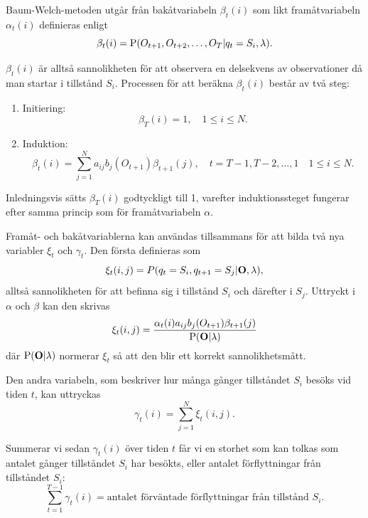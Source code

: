 \documentclass[../rapport_MVEX01-11-05]{subfiles}
\begin{document}
Baum-Welch-metoden utgår från bakåtvariabeln $\beta_t(i)$ som likt
framåtvariabeln $\alpha_t(i)$ definieras enligt
\begin{equation*}
\beta_t(i) = \mathrm{P}(O_{t+1},O_{t+2},\dots,O_T | q_t = S_i, \lambda).
\end{equation*} 

$\beta_t(i)$ är alltså sannolikheten för att observera en delsekvens av
observationer då man startar i tillstånd $S_i$. Processen för att beräkna $\beta_t(i)$ består av två steg:
\begin{enumerate}
\item Initiering: 
\begin{equation*}
\beta_T(i) = 1, \quad 1 \leq i \leq N.
\end{equation*}
\item Induktion: 
\begin{equation*}
\beta_t(i) = \sum\limits_{j=1}^Na_{ij}b_j(O_{t+1})\beta_{t+1}(j), \quad t =
T-1,T-2,\dots,1 \quad 1 \leq i \leq N.
\end{equation*}
\end{enumerate}

Inledningsvis sätts $\beta_T(i)$ godtyckligt till 1, varefter
induktionssteget fungerar efter samma princip som för framåtvariabeln
$\alpha$.

Framåt- och bakåtvariablerna kan användas tillsammans
för att bilda två nya variabler $\xi_t$ och $\gamma_t$.
Den första definieras som 
\begin{equation*}
\xi_t(i,j) = P(q_t = S_i, q_{t+1} = S_j|\mathbf{O},\lambda),
\end{equation*}
alltså sannolikheten för att befinna sig i tillstånd $S_i$ och
därefter i $S_j$. Uttryckt i $\alpha$ och $\beta$ kan den skrivas
\begin{equation*}
\xi_t(i,j) = \frac{\alpha_t(i)a_{ij}b_j(O_{t+1})\beta_{t+1}(j)}{\mathrm{P}(\mathbf{O}|\lambda)}
\end{equation*} 
där $\mathrm{P}(\mathbf{O}|\lambda)$ normerar $\xi_t$ så att den blir ett korrekt
sannolikhetsmått.

Den andra variabeln, som beskriver hur många gånger tillståndet $S_i$ besöks
vid tiden $t$, kan uttryckas
\begin{equation*}
\gamma_t(i) = \sum_{j=1}^N\xi_t(i,j).
\end{equation*}

Summerar vi sedan $\gamma_t(i)$ över tiden $t$ får vi en storhet
som kan tolkas som antalet gånger tillståndet $S_i$ har besökts,
eller antalet förflyttningar från tillståndet $S_i$:
\begin{equation*}
\sum_{t=1}^{T-1}\gamma_t(i) = \text{antalet förväntade förflyttningar
  från tillstånd $S_i$.}
\end{equation*} 
\end{document}
